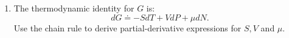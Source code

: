 \documentclass[fleqn]{article}
\begin{document}
\begin{enumerate}
\begin{enumerate}

    \end{enumerate}

    \item The thermodynamic identity for $G$ is:
    $$
      dG \doteq -S dT+V dP+\mu dN.
    $$
    Use the chain rule to derive partial-derivative expressions for $S, V$ and $\mu$.


  \end{enumerate}
\end{document}
